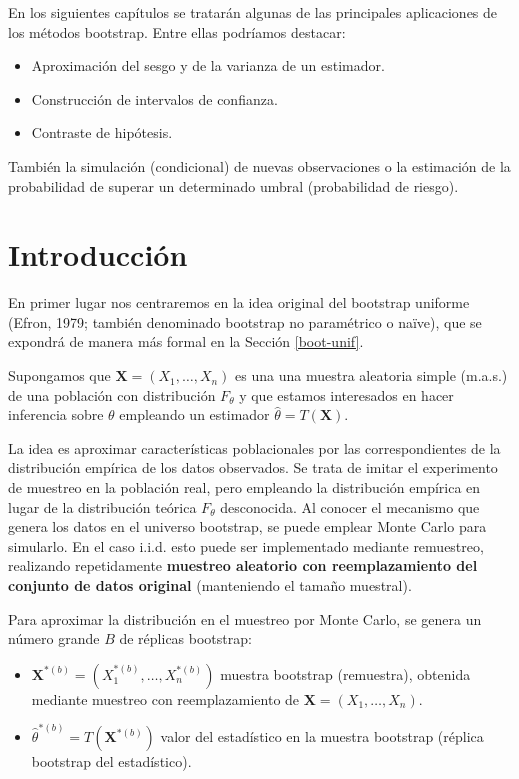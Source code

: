 \documentclass[
  10pt,
]{book}
\renewcommand{\mathbf}[1]{\symbf{#1}}
\theoremstyle{break}
\theoremstyle{nonumberplain}
\begin{document}
En los siguientes capítulos se tratarán algunas de las principales aplicaciones de los métodos bootstrap.
Entre ellas podríamos destacar:

\begin{itemize}
\item
  Aproximación del sesgo y de la varianza de un estimador.
\item
  Construcción de intervalos de confianza.
\item
  Contraste de hipótesis.
\end{itemize}

También la simulación (condicional) de nuevas observaciones o la estimación de la probabilidad de superar un determinado umbral (probabilidad de riesgo).

\hypertarget{boot-intro}{%
\section{Introducción}\label{boot-intro}}

En primer lugar nos centraremos en la idea original del bootstrap uniforme (Efron, 1979; también denominado bootstrap no paramétrico o naïve), que se expondrá de manera más formal en la Sección \ref{boot-unif}.

Supongamos que \(\mathbf{X}=\left( X_1,\ldots ,X_n \right)\) es una una muestra aleatoria simple (m.a.s.)
de una población con distribución \(F_{\theta}\) y que estamos interesados en hacer inferencia sobre \(\theta\) empleando un estimador \(\hat{\theta} = T\left( \mathbf{X} \right)\).

La idea es aproximar características poblacionales por las correspondientes de la distribución empírica de los
datos observados.
Se trata de imitar el experimento de muestreo en la población real, pero empleando la distribución empírica en lugar de la distribución teórica \(F_{\theta}\) desconocida.
Al conocer el mecanismo que genera los datos en el universo bootstrap, se puede emplear Monte Carlo para simularlo.
En el caso i.i.d. esto puede ser implementado mediante remuestreo, realizando repetidamente \textbf{muestreo aleatorio con reemplazamiento del conjunto de datos original} (manteniendo el tamaño muestral).

Para aproximar la distribución en el muestreo por Monte Carlo, se genera un número grande \(B\) de réplicas bootstrap:

\begin{itemize}
\item
  \(\mathbf{X}^{\ast (b)}=\left( X_1^{\ast (b)},\ldots ,X_n^{\ast (b)} \right)\) muestra bootstrap (remuestra),
  obtenida mediante muestreo con reemplazamiento de \(\mathbf{X}=\left( X_1,\ldots ,X_n \right)\).
\item
  \(\hat{\theta}^{\ast (b)} = T\left( \mathbf{X}^{\ast (b)} \right)\)
  valor del estadístico en la muestra bootstrap (réplica bootstrap del estadístico).
\end{itemize}
\end{document}
